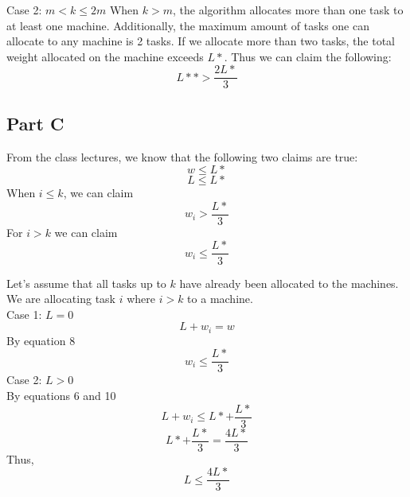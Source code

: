 \documentclass{article}
\theoremstyle{definition}
\theoremstyle{remark}
\theoremstyle{plain}
\begin{document}
Case 2: $m < k \leq 2m$
When $k > m$, the algorithm allocates more than one task to at least one machine. Additionally, the maximum amount of tasks one can allocate to any machine is 2 tasks. If we allocate more than two tasks, the total weight allocated on the machine exceeds $L*$. Thus we can claim the following:
\begin{equation}
L** > \frac{2 L*}{3}
\end{equation}


\subsection*{Part C}
From the class lectures, we know that the following two claims are true:
\begin{equation}
	w \leq L* 
\end{equation}
\begin{equation}
	L \leq L* 
\end{equation}
When $i \leq k$, we can claim
\begin{equation}
	w_i > \frac{L*}{3}
\end{equation}
For $i > k$ we can claim
\begin{equation}
	w_i \leq \frac{L*}{3}
\end{equation}

Let's assume that all tasks up to $k$ have already been allocated to the machines. We are allocating task $i$ where $i > k$ to a machine. \\
Case 1: $L = 0$\\
\begin{equation}
L+w_i = w
\end{equation}
By equation 8
\begin{equation}
w_i \leq \frac{L*}{3} 
\end{equation}
Case 2: $L > 0$\\
By equations 6 and 10
\begin{equation}
L + w_i \leq L* + \frac{L*}{3}
\end{equation}
\begin{equation}
L* + \frac{L*}{3} = \frac{4L*}{3}
\end{equation}
Thus,
\begin{equation}
L  \leq \frac{4L*}{3}
\end{equation}
\end{document}
